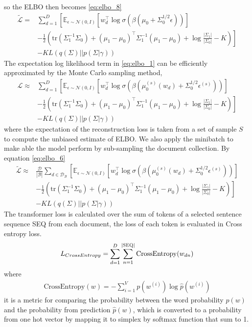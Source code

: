 so the ELBO then becomes \ref{eq:elbo_8}
\begin{align}\label{eq:elbo_8}
\tilde{\mathcal{L}}=&\sum_{d=1}^{D}\left[\mathbb{E}_{\epsilon\sim\mathcal{N}(0,I)}\left[w_d^\top\log\sigma(\beta(\mu_0+\Sigma_0^{1/2}\epsilon))\right]\right.\\
&\left.-\frac{1}{2}\left(\text{tr}(\Sigma_1^{-1}\Sigma_0)+(\mu_1-\mu_0)^\top\Sigma_1^{-1}(\mu_1-\mu_0)+\log\frac{|\Sigma_1|}{|\Sigma_0|}-K\right)\right]\\
&-KL(q(\Sigma)||p(\Sigma|\gamma))
\end{align}
The expectation log likelihood term in \ref{eq:elbo_1} can be efficiently approximated by the Monte Carlo sampling method,
\begin{align}\label{eq:elbo_2}
\mathcal{L}\approx&\sum_{d=1}^{D}\left[\mathbb{E}_{\epsilon\sim\mathcal{N}(0,I)}\left[w_d^\top\log\sigma(\beta(\mu_0^{(s)}(w_d)+\Sigma_0^{1/2}\epsilon^{(s)}))\right]\right.\\
&\left.-\frac{1}{2}\left(\text{tr}(\Sigma_1^{-1}\Sigma_0)+(\mu_1-\mu_0)^\top\Sigma_1^{-1}(\mu_1-\mu_0)+\log\frac{|\Sigma_1|}{|\Sigma_0|}-K\right)\right]\\
&-KL(q(\Sigma)||p(\Sigma|\gamma))
\end{align}
where the expectation of the reconstruction loss is taken from a set of sample $ S $ to compute the unbiased estimate of ELBO. We also apply the minibatch to make able the model perform by sub-sampling the document collection. By equation \ref{eq:elbo_6}
\begin{align}\label{eq:elbo_6}
\tilde{\mathcal{L}}\approx&\frac{\mathcal{D}}{|\mathcal{B}|}\sum_{d\in\mathcal{D_B}}\left[\mathbb{E}_{\epsilon\sim\mathcal{N}(0,I)}\left[w_d^\top\log\sigma(\beta(\mu_0^{(s)}(w_d)+\Sigma_0^{1/2}\epsilon^{(s)}))\right]\right.\\
&\left.-\frac{1}{2}\left(\text{tr}(\Sigma_1^{-1}\Sigma_0)+(\mu_1-\mu_0)^\top\Sigma_1^{-1}(\mu_1-\mu_0)+\log\frac{|\Sigma_1|}{|\Sigma_0|}-K\right)\right]\\
&-KL(q(\Sigma)||p(\Sigma|\gamma))
\end{align}
The transformer loss is calculated over the sum of tokens of a selected sentence sequence \textsc{SEQ} from each document, the loss of each token is evaluated in Cross entropy loss.
\begin{align}
L_{CrossEntropy}=\sum_{d=1}^{D}\sum_{n=1}^{|\textsc{SEQ}|}\text{CrossEntropy}(w_{dn})
\end{align}
where
\begin{align}
\text{CrossEntropy}(w) = -\sum_{i=1}^{V}p(w^{(i)})\log \hat{p}(w^{(i)})
\end{align}
it is a metric for comparing the probability between the word probability $ p(w) $ and the probability from prediction $ \hat{p}(w) $, which is converted to a probability from one hot vector by mapping it to simplex by softmax function that sum to 1.

